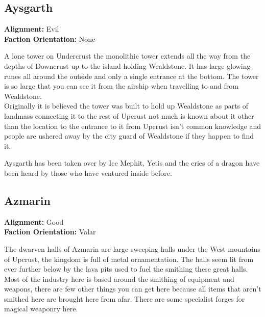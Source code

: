 \documentclass[10pt,twoside,twocolumn]{article}
\begin{document}
\subsection{Aysgarth}
\textbf{Alignment:} Evil \\
\textbf{Faction Orientation:} None \\
\begin{quotebox}
	A lone tower on Undercrust the monolithic tower extends all the way from the depths of Downcrust up to the island holding Wealdstone. It has large glowing runes all around the outside and only a single entrance at the bottom. The tower is so large that you can see it from the airship when travelling to and from Wealdstone. \\

	Originally it is believed the tower was built to hold up Wealdstone as parts of landmass connecting it to the rest of Upcrust not much is known about it other than the location to the entrance to it from Upcrust isn't common knowledge and people are ushered away by the city guard of Wealdstone if they happen to find it.\\
\end{quotebox}

Aysgarth has been taken over by Ice Mephit, Yetis and the cries of a dragon have been heard by those who have ventured inside before. \\

\subsection{Azmarin}
\textbf{Alignment:} Good \\
\textbf{Faction Orientation:} Valar \\
\begin{quotebox}
	The dwarven halls of Azmarin are large sweeping halls under the West mountains of Upcrust, the kingdom is full of metal ornamentation. The halls seem lit from ever further below by the lava pits used to fuel the smithing these great halls. \\
	
	Most of the industry here is based around the smithing of equipment and weapons, there are few other things you can get here because all items that aren't smithed here are brought here from afar. There are some specialist forges for magical weaponry here.
\end{quotebox}
\end{document}
